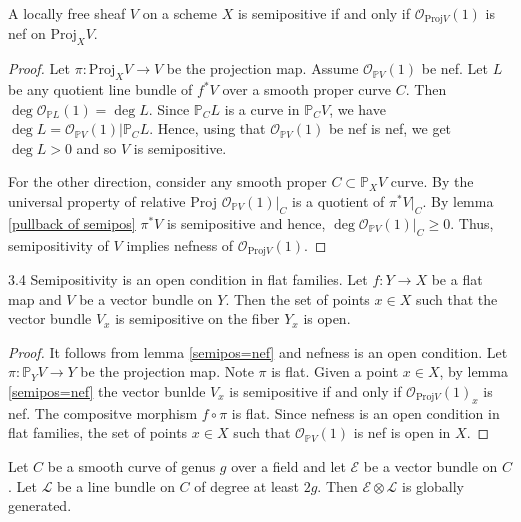 \begin{lemma}\label{semipos=nef}
A locally free sheaf $V$ on a scheme $X$ is semipositive if and only if $\mathcal{O}_{\mathrm{Proj} V}(1)$ is nef on $\mathrm{Proj}_XV$.
\end{lemma}
\begin{proof}
Let $\pi: \mathrm{Proj}_X V\to V$ be the projection map. Assume $\mathcal{O}_{\mathbb{P}V}(1)$ be nef. Let $L$ be  any quotient line bundle of $f^*V$ over a smooth proper curve $C$. Then $\deg \mathcal{O}_{\mathbb{P}L}(1)=\deg L$. Since $\mathbb{P}_CL$ is a curve in $\mathbb{P}_CV$, we have $\deg L=\mathcal{O}_{\mathbb{P}V}(1)|\mathbb{P}_CL$. Hence, using that $\mathcal{O}_{\mathbb{P}V}(1)$ be nef is nef, we get $\deg L>0$ and so $V$ is semipositive.

For the other direction, consider any smooth proper $C\subset \mathbb{P}_XV$ curve. By the universal property of relative Proj $\mathcal{O}_{\mathbb{P}V}(1)|_C$ is a quotient of $\pi^*V|_C$. By lemma \ref{pullback of semipos} $\pi^*V$ is semipositive and hence, $\deg  \mathcal{O}_{\mathbb{P}V}(1)|_C\geq 0$. Thus, semipositivity of $V$ implies nefness of $\mathcal{O}_{\mathrm{Proj} V}(1)$.
\end{proof}

\begin{lemma}
3.4 Semipositivity is an open condition in flat families.
Let $f:Y\to X$ be a flat map and $V$ be a vector bundle on $Y$. Then the set of points $x\in X$ such that the vector bundle $V_x$ is semipositive on the fiber $Y_x$ is open.
\end{lemma}

\begin{proof}
It follows from lemma \ref{semipos=nef} and nefness is an open condition.
Let $\pi:\mathbb{P}_YV\to Y$ be the projection map.  Note $\pi$ is flat. Given a point $x\in X$, by lemma \ref{semipos=nef} the vector bunlde $V_x$ is semipositive if and only if $\mathcal{O}_{\mathrm{Proj} V}(1)_x$ is nef. The compositve morphism $f\circ \pi$ is flat. Since nefness is an open condition in flat families, the set of points $x\in X$ such that $\mathcal{O}_{\mathbb{P}V}(1)$ is nef is open in $X$.
\end{proof}

\begin{lemma}\label{global_generation_of_twist_on_curve}
Let $C$ be a smooth curve of genus $g$ over a field and let $\mathcal{E}$ be a vector bundle on $C$. 
Let $\mathcal{L}$ be a line bundle on $C$ of degree at least $2g$. 
Then $\mathcal{E}\otimes\mathcal{L}$ is globally generated.
\end{lemma}


